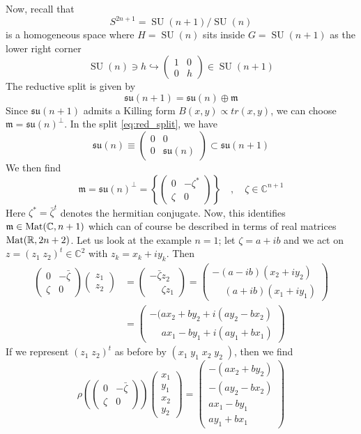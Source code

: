 \documentclass[a4paper,11pt]{article}
\theoremstyle{definition}
\newcommand{\RR}{\mathbb{R}}
\newcommand{\CC}{\mathbb{C}}
\DeclareMathOperator{\SU}{SU}
\newcommand{\m}{\mathfrak{m}}
\newcommand{\su}{\mathfrak{su}}
\newcommand{\mat}[4]{\begin{pmatrix} #1 & #2 \\ #3 & #4 \end{pmatrix}}
\newcommand{\vek}[2]{\begin{pmatrix} #1 \\ #2 \end{pmatrix}}
\begin{document}
Now, recall that 
\begin{equation}
  S^{2n + 1} = \SU(n+1) / \SU(n)
\end{equation}
is a homogeneous space where $H = \SU(n)$ sits inside $G = \SU(n+1)$ as the lower right corner
\begin{equation}
  \SU(n) \ni h \hookrightarrow \mat{1}{0}{0}{h} \in \SU(n+1)
\end{equation}
The reductive split is given by 
\begin{equation}
  \su(n+1) = \su(n) \oplus \m
  \label{eq:red_split}
\end{equation}
Since $\su(n+1)$ admits a Killing form $B(x,y) \propto tr(x,y)$, we can choose $\m = \su(n)^{\perp}$.
In the split \eqref{eq:red_split}, we have 
\begin{equation}
  \su(n) \equiv \mat{0}{0}{0}{\su(n)} \subset \su(n+1)
\end{equation}
We then find 
\begin{equation}
  \m = \su(n)^{\perp} = \left\{ \mat{0}{-\zeta^*}{\zeta}{0} \right\} \quad , \quad \zeta \in \CC^{n+1}
\end{equation}
Here $\zeta^* = \bar \zeta^t$ denotes the hermitian conjugate. 
Now, this identifies $\m \in {\rm Mat}(\CC, n+1)$ which can of course be described in terms of real matrices ${\rm Mat}(\RR, 2n + 2)$.  
Let us look at the example $n = 1$; let $\zeta = a + i b$ and we act on $z = (z_1\;z_2)^t \in \CC^2$ with $z_k = x_k + i y_k$.
Then 
\begin{equation}
  \begin{split} 
    \mat{0}{-\bar\zeta}{\zeta}{0} \vek{z_1}{z_2} &= \vek{-\bar\zeta z_2}{\phantom{-}\zeta z_1} = \vek{-(a-ib)(x_2 + i y_2)}{\phantom{-}(a + i b)(x_1 + i y_1)} \\
    &= \vek{- (ax_2 + by_2 + i(ay_2 - bx_2)}{\phantom{-}ax_1 - by_1 + i(ay_1 + b x_1)}
  \end{split}
\end{equation}
If we represent $(z_1\;z_2)^t$ as before by $(x_1\;y_1\;x_2\;y_2\;)$, then we find
\begin{equation}
  \rho\left( \mat{0}{-\bar\zeta}{\zeta}{0} \right) \begin{pmatrix} x_1 \\ y_1 \\ x_2 \\ y_2 \end{pmatrix} = \begin{pmatrix} - (ax_2 + by_2) \\ - (ay_2 - bx_2) \\ ax_1 - by_1 \\ ay_1 + b x_1 \end{pmatrix}
\end{equation}
\end{document}
